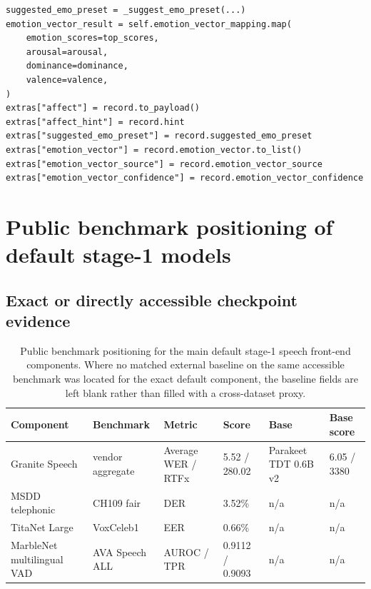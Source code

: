 \begin{lstlisting}[style=cfpython,caption={Condensed affect-analysis merge path adapted from \codepath{src/card_framework/audio_pipeline/affect_analysis.py}.},label={lst:affectmerge}]
suggested_emo_preset = _suggest_emo_preset(...)
emotion_vector_result = self.emotion_vector_mapping.map(
    emotion_scores=top_scores,
    arousal=arousal,
    dominance=dominance,
    valence=valence,
)
extras["affect"] = record.to_payload()
extras["affect_hint"] = record.hint
extras["suggested_emo_preset"] = record.suggested_emo_preset
extras["emotion_vector"] = record.emotion_vector.to_list()
extras["emotion_vector_source"] = record.emotion_vector_source
extras["emotion_vector_confidence"] = record.emotion_vector_confidence
\end{lstlisting}

\heuristicnote

\section{Public benchmark positioning of default stage-1 models}

\subsection{Exact or directly accessible checkpoint evidence}

\begin{table}[H]
\centering
\scriptsize
\begin{tabularx}{\textwidth}{L{2.0cm}L{2.5cm}L{1.2cm}L{1.5cm}L{2.1cm}L{1.3cm}}
\toprule
Component & Benchmark & Metric & Score & Base & Base score \\
\midrule
Granite Speech & vendor aggregate & Average WER / RTFx & 5.52 / 280.02 & Parakeet TDT 0.6B v2 & 6.05 / 3380 \\
MSDD telephonic & CH109 fair & DER & 3.52\% & n/a & n/a \\
TitaNet Large & VoxCeleb1 & EER & 0.66\% & n/a & n/a \\
MarbleNet multilingual VAD & AVA Speech ALL & AUROC / TPR & 0.9112 / 0.9093 & n/a & n/a \\
\bottomrule
\end{tabularx}
\caption{Public benchmark positioning for the main default stage-1 speech front-end components. Where no matched external baseline on the same accessible benchmark was located for the exact default component, the baseline fields are left blank rather than filled with a cross-dataset proxy.}
\label{tab:stage1-public}
\end{table}

